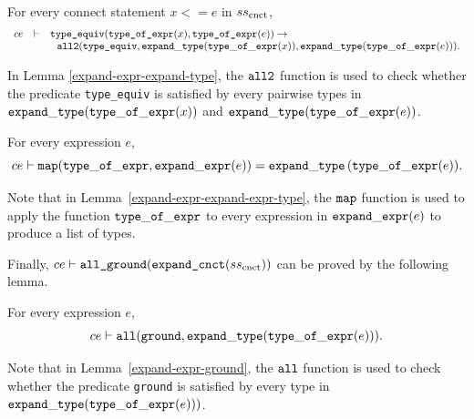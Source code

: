 {\begin{lemma}\label{expand-expr-expand-type}
For every connect statement $x <= e$ in $ss_{\rm cnct}$, 
$$
\begin{array}{l c l}
ce & \vdash & \mbox{\tt type\_equiv}(\mbox{\tt type\_of\_expr}(x), \mbox{\tt type\_of\_expr}(e)) \rightarrow \\
& & \ \ {\tt all2}(\mbox{\tt type\_equiv},{\tt expand\_type}({\tt type\_of\_expr}(x)),{\tt expand\_type}({\tt type\_of\_expr}(e))).
\end{array}
$$
\end{lemma}
In Lemma \ref{expand-expr-expand-type}, the ${\tt all2}$ function is used to check whether the predicate {\tt type\_equiv} is satisfied by every pairwise types in ${\tt expand\_type}({\tt type\_of\_expr}(x))$ and ${\tt expand\_type}({\tt type\_of\_expr}(e))$.

\begin{lemma}\label{expand-expr-expand-expr-type}
For every expression $e$, 
$$ce \vdash {\tt map}({\tt type\_of\_expr}, {\tt expand\_expr}(e)) = {\tt expand\_type}\,({\tt type\_of\_expr}(e)).$$
\end{lemma}
Note that in Lemma~\ref{expand-expr-expand-expr-type}, the ${\tt map}$ function is used to apply the function ${\tt type\_of\_expr}$ to every expression in ${\tt expand\_expr}(e)$ to produce a list of types. 

Finally, $ce \vdash \mbox{\tt all\_ground}(\mbox{\tt expand\_cnct}(ss_{\rm cnct}))$ can be proved by the following lemma. 
\begin{lemma}\label{expand-expr-ground}
For every expression $e$, 
$$ce \vdash {\tt all}({\tt ground}, {\tt expand\_type}({\tt type\_of\_expr}(e))).$$
\end{lemma}
Note that in Lemma~\ref{expand-expr-ground}, the ${\tt all}$ function is used to check whether the predicate {\tt ground} is satisfied by every type in ${\tt expand\_type}({\tt type\_of\_expr}(e)))$.
}

